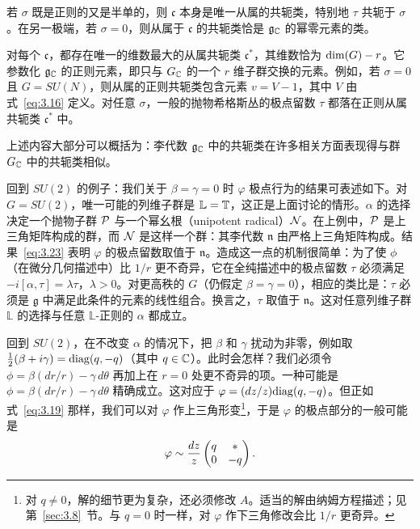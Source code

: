 若 $\sigma$ 既是正则的又是半单的，则 $\mathfrak c$ 本身是唯一从属的共轭类，特别地 $\tau$ 共轭于 $\sigma$。在另一极端，若 $\sigma=0$，则从属于 $\mathfrak c$ 的共轭类恰是 $\mathfrak g_{\mathbb{C}}$ 的幂零元素的类。

对每个 $\mathfrak c$，都存在唯一的维数最大的从属共轭类
${\mathfrak c}^*$，其维数恰为 ${\rm
dim}(G)-r$。它参数化 $\mathfrak g_{\mathbb{C}}$ 的正则元素，即只与 $G_{\mathbb{C}}$ 的一个 $r$ 维子群交换的元素。例如，若 $\sigma=0$ 且 $G=SU(N)$，则从属的正则共轭类包含元素 $v=V-1$，其中 $V$ 由式~\eqref{eq:3.16} 定义。对任意 $\sigma$，一般的抛物希格斯丛的极点留数 $\tau$ 都落在正则从属共轭类 ${\mathfrak c}^*$ 中。

上述内容大部分可以概括为：李代数
$\mathfrak g_{\mathbb{C}}$ 中的共轭类在许多相关方面表现得与群 $G_{\mathbb{C}}$ 中的共轭类相似。

\bigskip{}


回到 $SU(2)$ 的例子：我们关于 $\beta=\gamma=0$ 时 $\varphi$ 极点行为的结果可表述如下。对 $G=SU(2)$，唯一可能的列维子群是 $\mathbb{L}={\mathbb{T}}$，这正是上面讨论的情形。$\alpha$ 的选择决定一个抛物子群 $\mathcal{P}$ 与一个幂幺根（unipotent radical）$\mathcal{N}$。在上例中，$\mathcal{P}$ 是上三角矩阵构成的群，而 $\mathcal{N}$ 是这样一个群：其李代数 $\mathfrak n$ 由严格上三角矩阵构成。结果~\eqref{eq:3.23} 表明 $\varphi$ 的极点留数取值于 $\mathfrak n$。造成这一点的机制很简单：为了使 $\phi$（在微分几何描述中）比 $1/r$ 更不奇异，它在全纯描述中的极点留数 $\tau$ 必须满足 $-i[\alpha,\tau]=\lambda\tau$，$\lambda>0$。对更高秩的 $G$（仍假定 $\beta=\gamma=0$），相应的类比是：$\tau$ 必须是 $\mathfrak g$ 中满足此条件的元素的线性组合。换言之，$\tau$ 取值于 $\mathfrak n$。这对任意列维子群 $\mathbb{L}$ 的选择与任意 $\mathbb{L}$-正则的 $\alpha$ 都成立。

回到 $SU(2)$，在不改变 $\alpha$ 的情况下，把 $\beta$ 和 $\gamma$ 扰动为非零，例如取 $\frac{1}{2}(\beta+i\gamma)={\rm diag}(q,-q)$（其中 $q\in {\mathbb{C}}$）。此时会怎样？我们必须令 $\phi=\beta (dr/r)-\gamma\,d\theta$
再加上在 $r=0$ 处更不奇异的项。一种可能是 $\phi=\beta(dr/r)-\gamma\,d\theta$ 精确成立。这对应于 $\varphi=(dz/z){\rm diag}(q,-q)$。但正如式~\eqref{eq:3.19} 那样，我们可以对 $\varphi$ 作上三角形变\footnote{对 $q\not=0$，解的细节更为复杂，还必须修改 $A$。适当的解由纳姆方程描述；见第~\ref{sec:3.8}~节。与 $q=0$ 时一样，对 $\varphi$ 作下三角修改会比 $1/r$ 更奇异。}，于是 $\varphi$ 的极点部分的一般可能是
\setcounter{equation}{24}
\begin{equation}\label{eq:3.25}
  \varphi\sim{dz\over z}\left(\begin{matrix}q&
*\\ 0 & -q\end{matrix}\right).
\end{equation}

